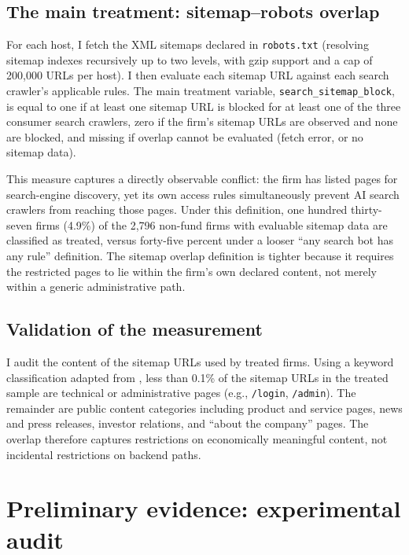 \documentclass[11pt]{article}
\begin{document}
\subsection{The main treatment: sitemap--robots overlap}

For each host, I fetch the XML sitemaps declared in \texttt{robots.txt}
(resolving sitemap indexes recursively up to two levels, with gzip support
and a cap of 200{,}000 URLs per host). I then evaluate each sitemap URL
against each search crawler's applicable rules. The main treatment variable,
\texttt{search\_sitemap\_block}, is equal to one if at least one sitemap URL
is blocked for at least one of the three consumer search crawlers, zero if
the firm's sitemap URLs are observed and none are blocked, and missing if
overlap cannot be evaluated (fetch error, or no sitemap data).

This measure captures a directly observable conflict: the firm has listed
pages for search-engine discovery, yet its own access rules simultaneously
prevent AI search crawlers from reaching those pages. Under this definition,
one hundred thirty-seven firms (4.9\%) of the 2{,}796 non-fund firms with
evaluable sitemap data are classified as treated, versus forty-five percent
under a looser ``any search bot has any rule'' definition. The sitemap
overlap definition is tighter because it requires the restricted pages to
lie within the firm's own declared content, not merely within a generic
administrative path.

\subsection{Validation of the measurement}

I audit the content of the sitemap URLs used by treated firms. Using a
keyword classification adapted from \citet{boulland2025website}, less than
0.1\% of the sitemap URLs in the treated sample are technical or
administrative pages (e.g., \texttt{/login}, \texttt{/admin}). The remainder
are public content categories including product and service pages, news and
press releases, investor relations, and ``about the company'' pages. The
overlap therefore captures restrictions on economically meaningful content,
not incidental restrictions on backend paths.

\section{Preliminary evidence: experimental audit}
\end{document}
